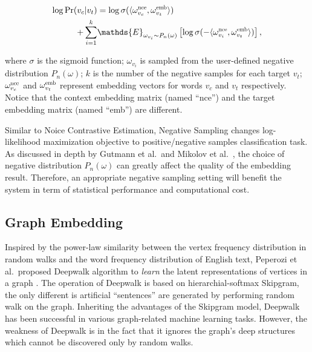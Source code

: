 \documentclass[letterpaper]{article}
\begin{document}
            \begin{equation}
                \label{eq:objneg}
                \begin{aligned}
                \log \mbox{Pr} (v_c | v_t) & = \log \sigma( \langle \omega^{\scalebox{0.7}{nce}}_{v_c} , \omega^{\scalebox{0.7}{emb}}_{v_t} \rangle ) \\
                + \sum_{i=1}^{k} & \mathds{E}_{\omega_{v_i} \sim P_n(\omega)} \left[ \log \sigma( -\langle \omega^{\scalebox{0.7}{nce}}_{v_i} , \omega^{\scalebox{0.7}{emb}}_{v_t} \rangle) \right],
                \end{aligned}
            \end{equation}
            
            \noindent
            where $\sigma$ is the sigmoid function; $\omega_{v_i}$ is sampled from the user-defined
            negative distribution $P_n(\omega)$; $k$ is the number of the negative samples for each target
            $v_t$; $\omega^{\scalebox{0.7}{nce}}_{v_c}$ and $\omega^{\scalebox{0.7}{emb}}_{v_t}$ 
            represent embedding vectors for words $v_c$ and $v_t$ respectively. Notice that the
            context embedding matrix (named ``nce'') and the target embedding matrix (named ``emb'')
            are different.

            Similar to Noice Contrastive Estimation, Negative Sampling changes log-likelihood
            maximization objective to positive/negative samples classification task. As discussed
            in depth by Gutmann et al.\ and Mikolov et al.\ , the choice of negative distribution 
            $P_n(\omega)$ can greatly affect the quality of the embedding result. Therefore, an
            appropriate negative sampling setting will benefit the system in term of statistical
            performance and computational cost.

        \subsection{Graph Embedding}
            
            Inspired by the power-law similarity between the vertex frequency distribution in
            random walks and the word frequency distribution of English text, Peperozi et al.\ proposed
            Deepwalk algorithm to \emph{learn} the latent representations of vertices in a
            graph \cite{deepwalk}. The operation of Deepwalk is based on hierarchial-softmax
            Skipgram, the only different is artificial ``sentences'' are generated by performing
            random walk on the graph. Inheriting the advantages of the Skipgram model, Deepwalk
            has been successful in various graph-related machine learning tasks. However, the weakness
            of Deepwalk is in the fact that it ignores the graph's deep structures which cannot 
            be discovered only by random walks. 
\end{document}
